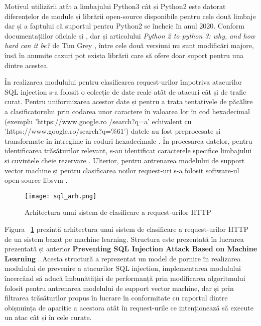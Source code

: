 Motivul utilizării atât a limbajului Python3 cât și Python2 este datorat diferențelor de module și librării open-source disponibile pentru cele două limbaje dar și a faptului că suportul pentru Python2 se încheie în anul 2020. Conform documentațiilor oficiale  \cite{python3_doc} și \cite{python2_doc}, dar și articolului \textit{Python 2 to python 3: why, and how hard can it be?} de Tim Grey \cite{why_python3},  între cele două versiuni nu sunt modificări majore, însă în anumite cazuri pot exista librării care să ofere doar suport pentru una dintre acestea. 

În realizarea modulului pentru clasificarea request-urilor împotriva atacurilor SQL injection s-a folosit o colecție de date reale atât de atacuri cât și de trafic curat. Pentru uniformizarea acestor date și pentru a trata tentativele de păcălire a clasificatorului prin codarea unor caractere în valoarea lor în cod hexadecimal (exemplu 'https://www.google.ro /search?q=a' echivalent cu 'https://www.google.ro/search?q=\%61') datele au fost preprocesate și transformate în întregime în coduri hexadecimale  \cite{ascii}.  În procesarea datelor, pentru identificarea trăsăturilor relevant, s-au identificat caracterele specifice limbajului \cite{char_sql} si cuvintele cheie rezervare \cite{key_sql}. Ulterior, pentru antrenarea modelului de support vector machine și pentru clasificarea noilor request-uri s-a folosit software-ul open-source libsvm \cite{libsvm_class}. 
\begin{figure}[h]
	\centering
	\texttt{[image: sql\_arh.png]}
	\caption{Arhitectura unui sistem de clasificare a request-urilor HTTP}
	\label{fig:sql-arh}
\end{figure}

Figura ~\ref{fig:sql-arh}  prezintă arhitectura unui sistem de clasificare a request-urilor HTTP de un sistem bazat pe machine learning. Structura este prezentată în lucrarea prezentată și anterior  \textbf{Preventing SQL Injection Attack Based on Machine Learning} \cite{sqli_how}.  Acesta structură a reprezentat un model de pornire în realizarea modulului de prevenire a atacurilor SQL injection, implementarea modulului încercând să aducă îmbunătățiri de performanță prin modificarea algoritmului folosit pentru antrenarea modelului de support vector machine, dar și prin filtrarea trăsăturilor propus în lucrare în conformitate cu raportul dintre obișnuința de apariție a acestora atât în request-urile ce intenționează să execute un atac cât și în cele curate. 


